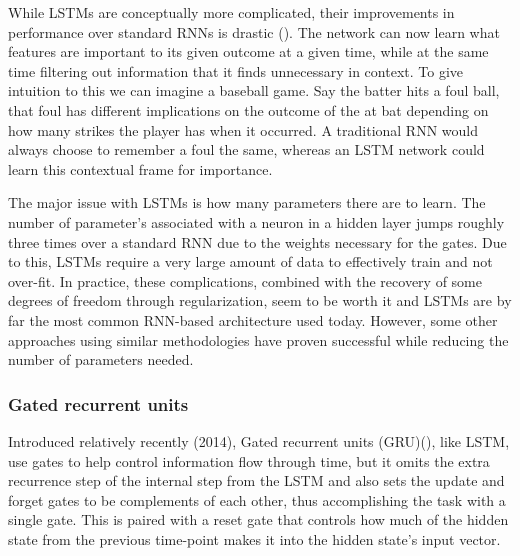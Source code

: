 \documentclass[]{book}
\theoremstyle{definition}
\theoremstyle{definition}
\theoremstyle{definition}
\theoremstyle{remark}
\begin{document}
While LSTMs are conceptually more complicated, their improvements in
performance over standard RNNs is drastic (\citet{lstm_intro}). The
network can now learn what features are important to its given outcome
at a given time, while at the same time filtering out information that
it finds unnecessary in context. To give intuition to this we can
imagine a baseball game. Say the batter hits a foul ball, that foul has
different implications on the outcome of the at bat depending on how
many strikes the player has when it occurred. A traditional RNN would
always choose to remember a foul the same, whereas an LSTM network could
learn this contextual frame for importance.

The major issue with LSTMs is how many parameters there are to learn.
The number of parameter's associated with a neuron in a hidden layer
jumps roughly three times over a standard RNN due to the weights
necessary for the gates. Due to this, LSTMs require a very large amount
of data to effectively train and not over-fit. In practice, these
complications, combined with the recovery of some degrees of freedom
through regularization, seem to be worth it and LSTMs are by far the
most common RNN-based architecture used today. However, some other
approaches using similar methodologies have proven successful while
reducing the number of parameters needed.

\subsubsection{Gated recurrent units}\label{gated-recurrent-units}

Introduced relatively recently (2014), Gated recurrent units
(GRU)(\citet{gru_intro}), like LSTM, use gates to help control
information flow through time, but it omits the extra recurrence step of
the internal step from the LSTM and also sets the update and forget
gates to be complements of each other, thus accomplishing the task with
a single gate. This is paired with a reset gate that controls how much
of the hidden state from the previous time-point makes it into the
hidden state's input vector.
\end{document}
